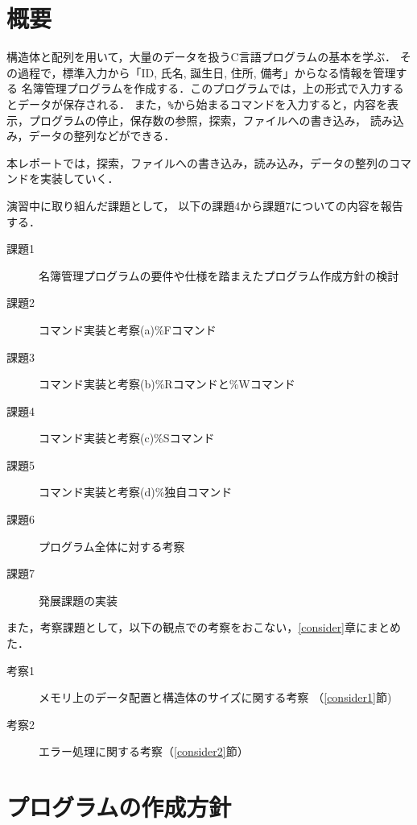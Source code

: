 \section{概要} \label{sec:abstract}
構造体と配列を用いて，大量のデータを扱うC言語プログラムの基本を学ぶ．
その過程で，標準入力から「ID, 氏名, 誕生日, 住所, 備考」からなる情報を管理する
名簿管理プログラムを作成する．このプログラムでは，上の形式で入力するとデータが保存される．
また，\verb|%|から始まるコマンドを入力すると，内容を表示，プログラムの停止，保存数の参照，探索，ファイルへの書き込み，
読み込み，データの整列などができる．

本レポートでは，探索，ファイルへの書き込み，読み込み，データの整列のコマンドを実装していく．


演習中に取り組んだ課題として，
以下の課題4から課題7についての内容を報告する．

\begin{description}
  \item[課題1]名簿管理プログラムの要件や仕様を踏まえたプログラム作成方針の検討
  \item[課題2]コマンド実装と考察(a)\%Fコマンド
  \item[課題3]コマンド実装と考察(b)\%Rコマンドと\%Wコマンド
  \item[課題4]コマンド実装と考察(c)\%Sコマンド
  \item[課題5]コマンド実装と考察(d)\%独自コマンド
  \item[課題6]プログラム全体に対する考察
  \item[課題7]発展課題の実装

\end{description}

また，考察課題として，以下の観点での考察をおこない，\ref{consider}章にまとめた．

\begin{description}
  \item[考察1]メモリ上のデータ配置と構造体のサイズに関する考察 （\ref{consider1}節)
  \item[考察2] エラー処理に関する考察（\ref{consider2}節）
\end{description}
\clearpage

\section{プログラムの作成方針} \label{sec:plan-of-programming}
    


